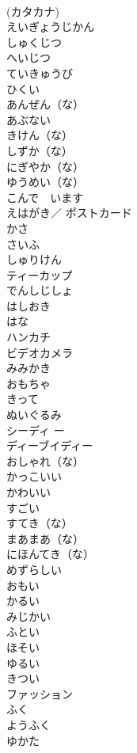 \documentclass[8pt]{extreport}
\begin{document}
\begin{CJK}{UTF8}{min}
\\	(カタカナ)
\\	えいぎょうじかん	
\\	しゅくじつ	
\\	へいじつ	
\\	ていきゅうび	
\\	ひくい	
\\	あんぜん（な）	
\\	あぶない 
\\	きけん（な）	
\\	しずか（な）	
\\	にぎやか（な）	
\\	ゆうめい（な）	
\\	こんで　います	
\\	えはがき／ ポストカード	
\\	かさ	
\\	さいふ	
\\	しゅりけん	
\\	ティーカップ	
\\	でんしじしょ	
\\	はしおき	
\\	はな	
\\	ハンカチ	
\\	ビデオカメラ	
\\	みみかき	
\\	おもちゃ	
\\	きって	
\\	ぬいぐるみ	
\\	シーディ ー	
\\	ディーブイディー	
\\	おしゃれ（な）	
\\	かっこいい	
\\	かわいい	
\\	すごい	
\\	すてき（な）	
\\	まあまあ（な）	
\\	にほんてき（な）	
\\	めずらしい	
\\	おもい	
\\	かるい	
\\	みじかい	
\\	ふとい	
\\	ほそい	
\\	ゆるい	
\\	きつい	
\\	ファッション	
\\	ふく	
\\	ようふく	
\\	ゆかた	

\end{CJK}
\end{document}
